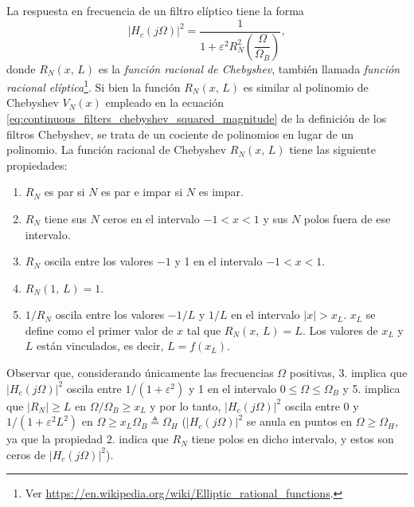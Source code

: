 \documentclass[a4paper]{report}
\begin{document}
La respuesta en frecuencia de un filtro elíptico tiene la forma 
\begin{equation}\label{eq:continuous_filters_elliptic_squared_magnitude}
 |H_c(j\Omega)|^2=\dfrac{1}{1+\varepsilon^2R^2_N\left(\dfrac{\Omega}{\Omega_B}\right)},
\end{equation}
donde \(R_N(x,\,L)\) es la \emph{función racional de Chebyshev}, también llamada \emph{función racional elíptica}\footnote{Ver \url{https://en.wikipedia.org/wiki/Elliptic_rational_functions}.}. Si bien la función \(R_N(x,\,L)\) es similar al polinomio de Chebyshev \(V_N(x)\) empleado en la ecuación \ref{eq:continuous_filters_chebyshev_squared_magnitude} de la definición de los filtros Chebyshev, se trata de un cociente de polinomios en lugar de un polinomio. La función racional de Chebyshev \(R_N(x,\,L)\) tiene las siguiente propiedades:
\begin{enumerate}
 \item \(R_N\) es par si \(N\) es par e impar si \(N\) es impar.
 \item \(R_N\) tiene sus \(N\) ceros en el intervalo \(-1<x<1\) y sus \(N\) polos fuera de ese intervalo.
 \item \(R_N\) oscila entre los valores \(-1\) y 1 en el intervalo \(-1<x<1\).
 \item \(R_N(1,\,L)=1\).
 \item \(1/R_N\) oscila entre los valores \(-1/L\) y \(1/L\) en el intervalo \(|x|>x_L\). \(x_L\) se define como el primer valor de \(x\) tal que \(R_N(x,\,L)=L\). Los valores de \(x_L\) y \(L\) están vinculados, es decir, \(L=f(x_L)\).
\end{enumerate}
Observar que, considerando únicamente las frecuencias \(\Omega\) positivas, 3. implica que \(|H_c(j\Omega)|^2\) oscila entre \(1/(1+\varepsilon^2)\) y 1 en el intervalo \(0\leq\Omega\leq\Omega_B\) y 5. implica que \(|R_N|\geq L\) en \(\Omega/\Omega_B\geq x_L\) y por lo tanto, \(|H_c(j\Omega)|^2\) oscila entre 0 y \(1/(1+\varepsilon^2L^2)\) en \(\Omega\geq x_L\Omega_B\triangleq\Omega_H\) (\(|H_c(j\Omega)|^2\) se anula en puntos en \(\Omega\geq\Omega_H\), ya que la propiedad 2. indica que \(R_N\) tiene polos en dicho intervalo, y estos son ceros de \(|H_c(j\Omega)|^2\)). 
\end{document}
